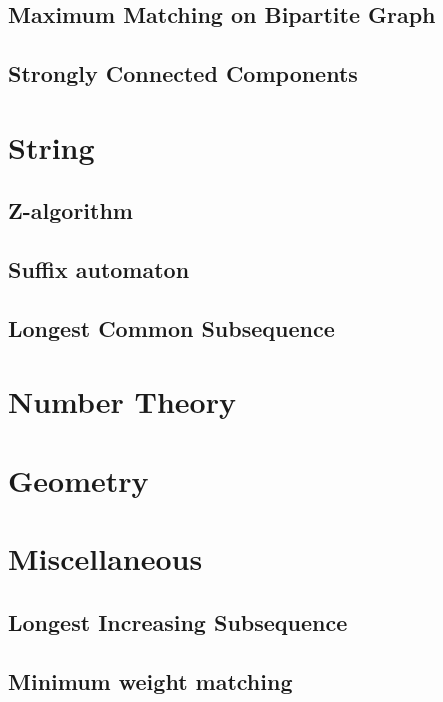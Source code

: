 \documentclass[a4paper,11pt]{article}
\begin{document}
  \subsection{Maximum Matching on Bipartite Graph}
    
  
  \subsection{Strongly Connected Components}
    

\section{String}
  \subsection{Z-algorithm}
      

  \subsection{Suffix automaton}
      
  
  \subsection{Longest Common Subsequence}
    

\section{Number Theory}
  

\section{Geometry}
  

\section{Miscellaneous}
  \subsection{Longest Increasing Subsequence}
        
    
    
  \subsection{Minimum weight matching}
    
\end{document}
